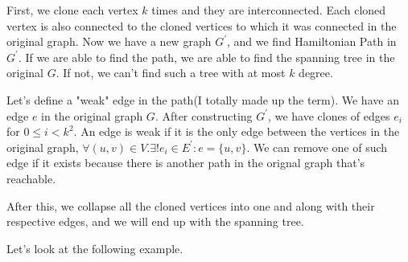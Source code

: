 \documentclass{article}
\begin{document}
\begin{enumerate}
\begin{enumerate}
        First, we clone each vertex $k$ times and they are interconnected.
        Each cloned vertex is also connected to the cloned vertices to which it was connected in the original graph.
        Now we have a new graph $G^\prime$, and we find Hamiltonian Path in $G^\prime$.
        If we are able to find the path, we are able to find the spanning tree in the original $G$.
        If not, we can't find such a tree with at most $k$ degree.

        Let's define a "weak" edge in the path(I totally made up the term).
        We have an edge $e$ in the original graph $G$.
        After constructing $G^\prime$, we have clones of edges $e_i$ for $0\leq i < k^2$.
        An edge is weak if it is the only edge between the vertices in the original graph, $\forall (u,v)\in V.\exists!e_i\in E^\prime:e=\{u,v\}.$
        We can remove one of such edge if it exists because there is another path in the orignal graph that's reachable.

        After this, we collapse all the cloned vertices into one and along with their respective edges, and we will end up with the spanning tree.

        Let's look at the following example.


\end{enumerate}
\end{enumerate}
\end{document}
